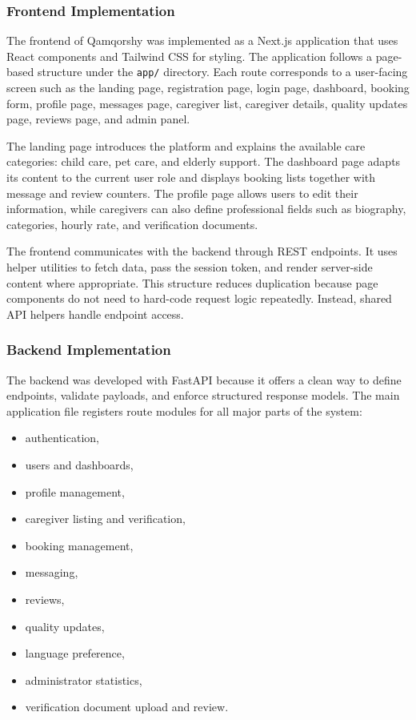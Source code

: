 \documentclass[12pt,a4paper]{article}
\begin{document}
\subsubsection{Frontend Implementation}

The frontend of Qamqorshy was implemented as a Next.js application that uses React components and Tailwind CSS for styling. The application follows a page-based structure under the \texttt{app/} directory. Each route corresponds to a user-facing screen such as the landing page, registration page, login page, dashboard, booking form, profile page, messages page, caregiver list, caregiver details, quality updates page, reviews page, and admin panel.

The landing page introduces the platform and explains the available care categories: child care, pet care, and elderly support. The dashboard page adapts its content to the current user role and displays booking lists together with message and review counters. The profile page allows users to edit their information, while caregivers can also define professional fields such as biography, categories, hourly rate, and verification documents.

The frontend communicates with the backend through REST endpoints. It uses helper utilities to fetch data, pass the session token, and render server-side content where appropriate. This structure reduces duplication because page components do not need to hard-code request logic repeatedly. Instead, shared API helpers handle endpoint access.

\subsubsection{Backend Implementation}

The backend was developed with FastAPI because it offers a clean way to define endpoints, validate payloads, and enforce structured response models. The main application file registers route modules for all major parts of the system:

\begin{itemize}[leftmargin=1.5cm]
    \item authentication,
    \item users and dashboards,
    \item profile management,
    \item caregiver listing and verification,
    \item booking management,
    \item messaging,
    \item reviews,
    \item quality updates,
    \item language preference,
    \item administrator statistics,
    \item verification document upload and review.
\end{itemize}
\end{document}
